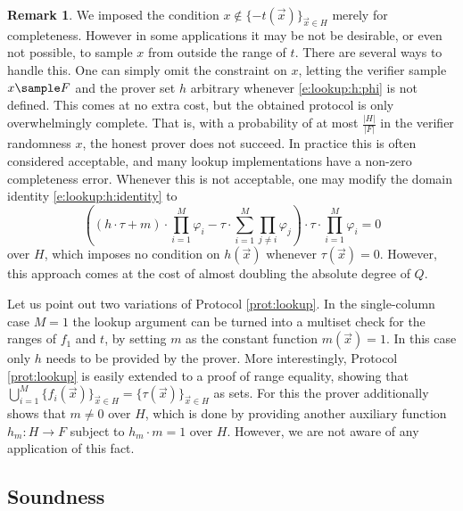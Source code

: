 \documentclass[11pt]{article}
\theoremstyle{definition}
\theoremstyle{definition}
\newtheorem{rem}[thm]{Remark}
\begin{document}
\begin{rem}
\label{rem:lookup:completeness}
We imposed the condition $x\notin \{- t(\vec x)\}_{\vec x \in H}$ merely for completeness. 
However in some applications it may be not be desirable, or even not possible, to sample $x$ from outside the range of $t$.
There are several ways to handle this.
One can simply omit the constraint on $x$, letting the verifier sample $x\sample F$ and the prover set $h$ arbitrary whenever \eqref{e:lookup:h:phi} is not defined.
This comes at no extra cost, but the obtained protocol is only overwhelmingly complete. 
That is, with a probability of at most $\frac{|H|}{|F|}$ in the verifier randomness $x$, the honest prover does not succeed.
In practice this is often considered acceptable, and many lookup implementations have a non-zero completeness error. 
Whenever this is not acceptable, one may modify the domain identity \eqref{e:lookup:h:identity} to 
\begin{equation}
\label{e:lookup:h:identity:complete}
\left((h \cdot \tau + m) \cdot \prod_{i=1}^M \varphi_i - \tau\cdot \sum_{i=1}^M \prod_{j\neq i} \varphi_j\right)\cdot \tau\cdot  \prod_{i=1}^M \varphi_i  = 0
\end{equation}
over $H$, which imposes no condition on $h(\vec x)$ whenever $\tau(\vec x)= 0$. 
However, this approach comes at the cost of almost doubling the absolute degree of $Q$.
\end{rem}

Let us point out two variations of Protocol \ref{prot:lookup}.
In the single-column case $M=1$ the lookup argument can be turned into a multiset check for the ranges of $f_1$ and $t$, by setting $m$ as the constant function $m(\vec x) = 1$.
In this case only $h$ needs to be provided by the prover.
More interestingly, Protocol \ref{prot:lookup} is easily extended to a proof of range equality, showing that $\bigcup_{i=1}^M \{f_i(\vec x)\}_{\vec x\in H} = \{\tau (\vec x)\}_{\vec x\in H}$ as sets.
For this the prover additionally shows that $m \neq 0$ over $H$, which is done by providing another auxiliary function $h_m: H\rightarrow F$ subject to $h_m\cdot m = 1$ over $H$.
However, we are not aware of any application of this fact.








\subsection{Soundness}
\label{s:lookup:soundness}
\end{document}
